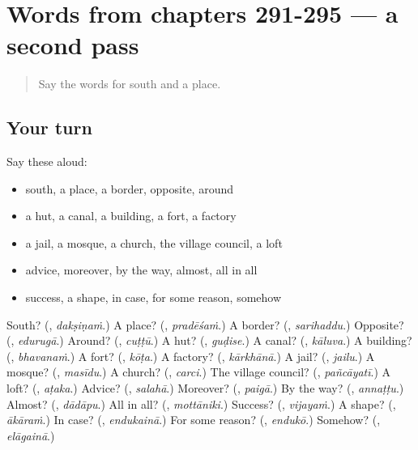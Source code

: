 \section[(dialogue)]{Words from chapters 291-295 — a second pass}

\label{lesson:TE-R295-second-pass-words-from-chapters-291-295}



\begin{quote}
Say the words for south and a place.
\end{quote}

\subsection*{Your turn}
Say these aloud:

\begin{itemize}
\raggedright
  \item south, a place, a border, opposite, around
  \item a hut, a canal, a building, a fort, a factory
  \item a jail, a mosque, a church, the village council, a loft
  \item advice, moreover, by the way, almost, all in all
  \item success, a shape, in case, for some reason, somehow
\end{itemize}

\begin{tcolorbox}[breakable,colback=teal!4,colframe=teal!35!black,title={Before you move on}]
South? (\textbf{}, \emph{dakṣiṇaṁ}.) A place? (\textbf{}, \emph{pradēśaṁ}.) A border? (\textbf{}, \emph{sarihaddu}.) Opposite? (\textbf{}, \emph{edurugā}.) Around? (\textbf{}, \emph{cuṭṭū}.) A hut? (\textbf{}, \emph{guḍise}.) A canal? (\textbf{}, \emph{kāluva}.) A building? (\textbf{}, \emph{bhavanaṁ}.) A fort? (\textbf{}, \emph{kōṭa}.) A factory? (\textbf{}, \emph{kārkhānā}.) A jail? (\textbf{}, \emph{jailu}.) A mosque? (\textbf{}, \emph{masīdu}.) A church? (\textbf{}, \emph{carci}.) The village council? (\textbf{}, \emph{pañcāyatī}.) A loft? (\textbf{}, \emph{aṭaka}.) Advice? (\textbf{}, \emph{salahā}.) Moreover? (\textbf{}, \emph{paigā}.) By the way? (\textbf{}, \emph{annaṭṭu}.) Almost? (\textbf{}, \emph{dādāpu}.) All in all? (\textbf{}, \emph{mottāniki}.) Success? (\textbf{}, \emph{vijayaṁ}.) A shape? (\textbf{}, \emph{ākāraṁ}.) In case? (\textbf{}, \emph{endukainā}.) For some reason? (\textbf{}, \emph{endukō}.) Somehow? (\textbf{}, \emph{elāgainā}.)
\end{tcolorbox}
